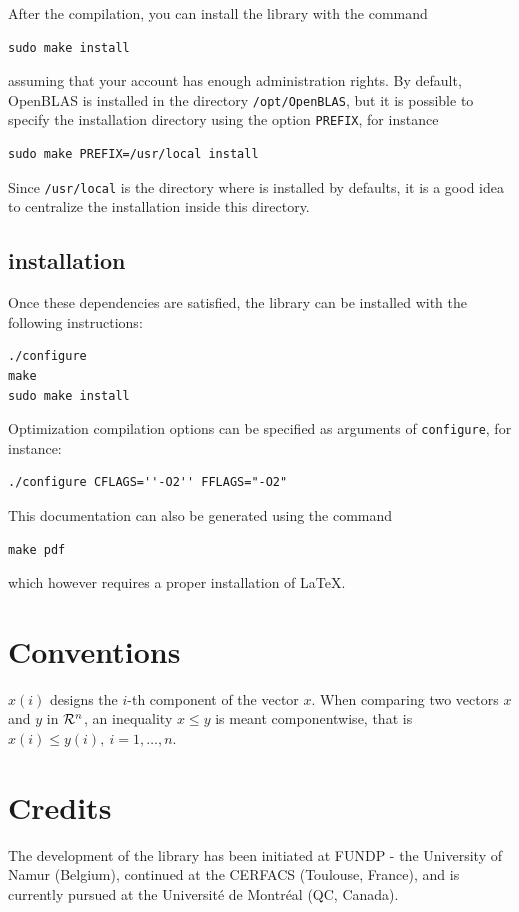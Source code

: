 After the compilation, you can install the library with the command
\begin{verbatim}
sudo make install
\end{verbatim}
assuming that your account has enough administration rights.
By default, OpenBLAS is installed in the directory \verb|/opt/OpenBLAS|, but it is possible to specify the installation directory using the option \verb|PREFIX|, for instance
\begin{verbatim}
sudo make PREFIX=/usr/local install
\end{verbatim}
Since \verb|/usr/local| is the directory where \oratio{} is installed by defaults, it is a good idea to centralize the installation inside this directory.

\subsection{\oratio{} installation}

Once these dependencies are satisfied, the library can
be installed with the following instructions:
\begin{verbatim}
./configure
make
sudo make install
\end{verbatim}
Optimization compilation options can be specified as arguments of \verb|configure|, for instance:
\begin{verbatim}
./configure CFLAGS=''-O2'' FFLAGS="-O2"
\end{verbatim}

This documentation can also be generated using the command
\begin{verbatim}
make pdf
\end{verbatim}
which however requires a proper installation of \LaTeX.

\section{Conventions}

$x(i)$ designs the $i$-th component of the vector $x$.
When comparing two vectors $x$ and $y$ in $\mathcal{R}^n$, an inequality $x \leq y$ is meant componentwise,
that is $x(i) \leq y(i),\ i = 1,\ldots,n$.

\section{Credits}

The development of the library has been initiated at FUNDP - the University of
Namur (Belgium), continued at the CERFACS (Toulouse, France), and is
currently pursued at the Universit\'e de Montr\'eal (QC, Canada).

